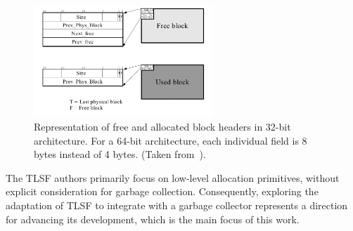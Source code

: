 \begin{figure}[H]
    \centering
    \includegraphics[width=0.60\textwidth]{figures/blockheader_reference.png}
    \caption{Representation of free and allocated block headers in 32-bit architecture. For a 64-bit architecture, each individual field is 8 bytes instead of 4 bytes. (Taken from~\cite{TLSF}).}
    \label{fig:blockheader_reference}
\end{figure}


The TLSF authors primarily focus on low-level allocation primitives, without explicit consideration for garbage collection. Consequently, exploring the adaptation of TLSF to integrate with a garbage collector represents a direction for advancing its development, which is the main focus of this work.

